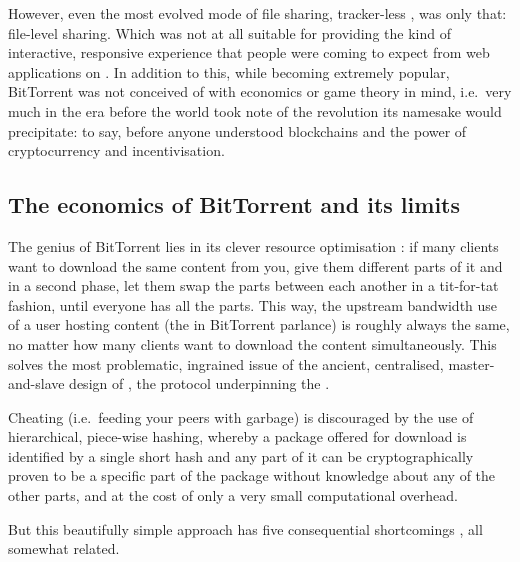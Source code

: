 However, even the most evolved mode of  file sharing, tracker-less  \cite{pouwelse2005bittorrent}, was only that: file-level sharing. Which was not at all suitable for providing the kind of interactive, responsive experience that people were coming to expect from web applications on . In addition to this, while becoming extremely popular, BitTorrent was not conceived of with economics or game theory in mind, i.e.\ very much in the era before the world took note of the revolution its namesake would precipitate: to say, before anyone understood blockchains and the power of cryptocurrency and incentivisation.

\subsection{The economics of BitTorrent and its limits \statusgreen}

The genius of BitTorrent lies in its clever resource optimisation \cite{cohen2003incentives}: if many clients want to download the same content from you, give them different parts of it and in a second phase, let them swap the parts between each another in a tit-for-tat fashion, until everyone has all the parts. This way, the upstream bandwidth use of a user hosting  content (the  in BitTorrent parlance) is roughly always the same, no matter how many clients want to download the content simultaneously. This solves the most problematic, ingrained issue of the ancient, centralised, master-and-slave design of , the protocol underpinning the .

Cheating (i.e.\ feeding your peers with garbage) is discouraged by the use of hierarchical, piece-wise hashing, whereby a package offered for download is identified by a single short hash and any part of it can be cryptographically proven to be a specific part of the package without knowledge about any of the other parts, and at the cost of only a very small computational overhead. 

But this beautifully simple approach has five consequential shortcomings \cite{locher2006free,piatek2007incentives}, all somewhat related.

